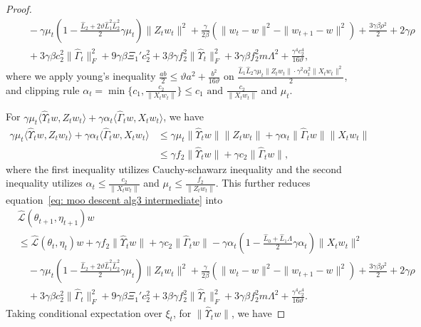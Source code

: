 \documentclass[twoside]{article} %
\def\eqref#1{equation~\ref{#1}}
\theoremstyle{plain}
\theoremstyle{definition}
\theoremstyle{remark}
\newcommand{\HGamma}{\hat{\Gamma}}
\newcommand{\HUpsilon}{\hat{\Upsilon}}
\newcommand{\hL}{\hat{L}}
\newcommand{\fhL}{\hat{\mathcal{L}}}
\begin{document}
\begin{proof}
\begin{align}
    &\quad - \gamma\mu_t(1-\frac{\hL_2+2\vartheta\hL_1^2\hL_2^2}{2}\gamma\mu_t)\|Z_tw_t\|^2+\frac{\gamma}{2\beta}(\|w_t-w\|^2-\|w_{t+1}-w\|^2)+\frac{3\gamma\beta\rho^2}{2}+2\gamma\rho  \nonumber\\
    &\quad+ 3\gamma\beta c_2^2\|\HGamma_t\|_F^2+ 9\gamma\beta\Xi_1'c_2^2+ 3\beta\gamma{f_2^2}\|\HUpsilon_t\|_F^2+3\gamma\beta{f_2^2}m\Lambda^2 + \frac{\gamma^4c_2^4}{16\vartheta},
    \label{eq: moo descent alg3 intermediate}
\end{align}
where we apply young's inequality $\frac{ab}{2}\leq  \vartheta a^2+\frac{b^2}{16\vartheta}$ on $\frac{\hL_1\hL_2\gamma\mu_t\|Z_tw_t\|\cdot\gamma^2\alpha_t^2\|X_tw_t\|^2}{2}$,  and clipping rule ${\alpha_t = \min\{c_1, \frac{c_2}{\|X_tw_t\|} \}}\leq c_1 \text{ and }\frac{c_2}{\|X_tw_t\|}$ and $\mu_t$.

For $\gamma\mu_t\langle \HUpsilon_tw,Z_tw_t\rangle+\gamma\alpha_t\langle \HGamma_tw, X_tw_t\rangle$, we have
\begin{align}
    \gamma\mu_t\langle \HUpsilon_tw,Z_tw_t\rangle+\gamma\alpha_t\langle \HGamma_tw, X_tw_t\rangle&\leq \gamma\mu_t\| \HUpsilon_tw\| \|Z_tw_t\| + \gamma\alpha_t\|\HGamma_tw\|\|X_tw_t\|\nonumber\\
    &\leq \gamma {f_2}\|\HUpsilon_tw\|+\gamma c_2\| \HGamma_tw\|,
    \label{eq: non-martingale-sequence alg3}
\end{align}
where the first inequality utilizes Cauchy-schawarz inequality and the second inequality utilizes $\alpha_t\leq \frac{c_2}{\|X_tw_t\|}$ and $\mu_t\leq \frac{f_2}{\| Z_tw_t\|}$. This further reduces \eqref{eq: moo descent alg3 intermediate} into
\begin{align}
    &\fhL(\theta_{t+1},\eta_{t+1})w\nonumber\\
    &\leq \fhL(\theta_t,\eta_t)w+\gamma {f_2}\|\HUpsilon_tw\|+\gamma c_2\| \HGamma_tw\|-\gamma\alpha_t(1-\frac{\hL_0+\hL_1\Lambda}{2}\gamma\alpha_t)\|X_tw_t\|^2\nonumber\\
    &\quad - \gamma\mu_t(1-\frac{\hL_2+2\vartheta\hL_1^2\hL_2^2}{2}\gamma\mu_t)\|Z_tw_t\|^2+\frac{\gamma}{2\beta}(\|w_t-w\|^2-\|w_{t+1}-w\|^2)+\frac{3\gamma\beta\rho^2}{2}+2\gamma\rho  \nonumber\\
    &\quad+ 3\gamma\beta c_2^2\|\HGamma_t\|_F^2+ 9\gamma\beta\Xi_1'c_2^2+ 3\beta\gamma{f_2^2}\|\HUpsilon_t\|_F^2+3\gamma\beta{f_2^2}m\Lambda^2 + \frac{\gamma^4c_2^4}{16\vartheta}.
    \label{eq: one-step moo descent alg3}
\end{align}
Taking conditional expectation over $\xi_t$, for $\|\HUpsilon_tw\|$, we have

\end{proof}
\end{document}
